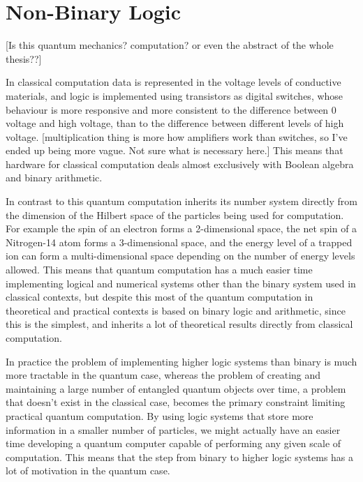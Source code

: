 \section{Non-Binary Logic}
[Is this quantum mechanics? computation? or even the abstract of the whole thesis??]

In classical computation data is represented in the voltage levels of conductive materials, and logic is implemented using transistors as digital switches, whose behaviour is more responsive and more consistent to the difference between 0 voltage and high voltage, than to the difference between different levels of high voltage. [multiplication thing is more how amplifiers work than switches, so I've ended up being more vague. Not sure what is necessary here.] This means that hardware for classical computation deals almost exclusively with Boolean algebra and binary arithmetic.

In contrast to this quantum computation inherits its number system directly from the dimension of the Hilbert space of the particles being used for computation. For example the spin of an electron forms a 2-dimensional space, the net spin of a Nitrogen-14 atom forms a 3-dimensional space, and the energy level of a trapped ion can form a multi-dimensional space depending on the number of energy levels allowed. This means that quantum computation has a much easier time implementing logical and numerical systems other than the binary system used in classical contexts, but despite this most of the quantum computation in theoretical and practical contexts is based on binary logic and arithmetic, since this is the simplest, and inherits a lot of theoretical results directly from classical computation.

In practice the problem of implementing higher logic systems than binary is much more tractable in the quantum case, whereas the problem of creating and maintaining a large number of entangled quantum objects over time, a problem that doesn't exist in the classical case, becomes the primary constraint limiting practical quantum computation. By using logic systems that store more information in a smaller number of particles, we might actually have an easier time developing a quantum computer capable of performing any given scale of computation. This means that the step from binary to higher logic systems has a lot of motivation in the quantum case.

